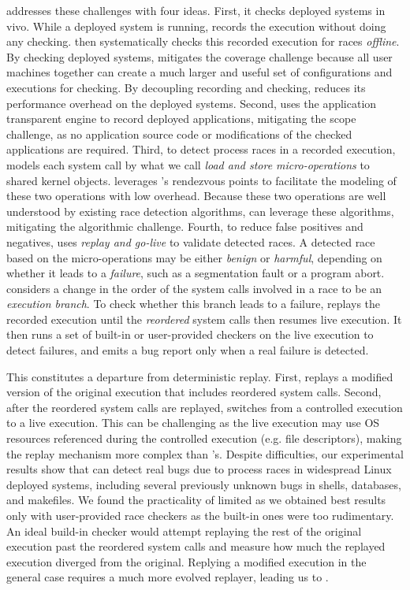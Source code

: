 \racepro addresses these challenges with four ideas.  First, it checks deployed
systems in vivo.  While a deployed system is running, \racepro records
the execution without doing any checking.  \racepro then systematically checks
this recorded execution for races \emph{offline}.  By checking deployed systems,
\racepro mitigates the coverage challenge because all user machines together can
create a much larger and useful set of configurations and executions for
checking.  By decoupling recording and checking, \racepro reduces its
performance overhead on the deployed systems.
Second, \racepro uses the application transparent \scribe engine to record
deployed applications, mitigating the scope challenge, as no application source
code or modifications of the checked applications are required.
Third, to detect process races in a recorded execution,
\racepro models each system call by what we call \emph{load and store
micro-operations} to shared kernel objects.  \racepro leverages \scribe's
rendezvous points to facilitate the modeling of these two operations with low
overhead.  Because these two operations are well understood by existing race
detection algorithms, \racepro can leverage these algorithms, mitigating the
algorithmic challenge.  Fourth, to reduce false positives and negatives,
\racepro uses \emph{replay and go-live} to validate detected races.  A
detected race based on the micro-operations may be either \emph{benign} or
\emph{harmful}, depending on whether it leads to a \emph{failure}, such as a
segmentation fault or a program abort.  \racepro considers a change in the order
of the system calls involved in a race to be an \emph{execution branch}.  To
check whether this branch leads to a failure, \racepro replays the recorded
execution until the \emph{reordered} system calls then resumes live execution.
It then runs a set of built-in or user-provided checkers on the live execution
to detect failures, and emits a bug report only when a real failure is detected.

This constitutes a departure from deterministic replay. First, \racepro
replays a modified version of the original execution that includes reordered system calls.
Second, after the reordered system calls are replayed, \racepro switches from a
controlled execution to a live execution. This can be challenging as the live
execution may use OS resources referenced during the controlled execution (e.g.
file descriptors), making the replay mechanism more complex than \scribe's.
Despite difficulties, our experimental results show that \racepro can detect
real bugs due to process races in widespread Linux deployed systems, including
several previously unknown bugs in shells, databases, and makefiles.
We found the practicality of \racepro limited as we obtained
best results only with user-provided race checkers as the built-in ones
were too rudimentary. An ideal build-in checker would attempt replaying the rest
of the original execution past the reordered system calls and measure how much
the replayed execution diverged from the original. Replying a modified execution
in the general case requires a much more evolved replayer, leading us to \dora.

